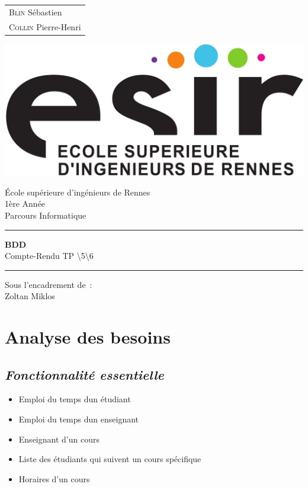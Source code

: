 \documentclass{article}
\begin{document}
\begin{titlepage}
	\vspace{-20px}
	\begin{tabular}{l}
		\textsc{Blin} S\'ebastien\\
		\textsc{Collin} Pierre-Henri
	\end{tabular}
	\hfill \vspace{10px}\includegraphics[scale=0.1]{esir.png}\\
	\vfill
	\begin{center}
		\Huge{\'Ecole sup\'erieure d'ing\'enieurs de Rennes}\\
		\vspace{1cm}
		\LARGE{1\`ere Ann\'ee}\\
		\large{Parcours Informatique}\\
		\vspace{0.5cm}\hrule\vspace{0.5cm}
		\LARGE{\textbf{BDD}}\\
		\Large{Compte-Rendu TP \textbackslash5\textbackslash6}
		\vspace{0.5cm}\hrule
		\vfill
		\vfill
	\end{center}
	\begin{flushleft}
		\Large{Sous l'encadrement de~:}\\
		\vspace{0.2cm}
		\large{{Zoltan} Miklos}
	\end{flushleft}
	\vfill
\end{titlepage}
\section{Analyse des besoins}
\subsection{\textit{Fonctionnalit\'e essentielle}}
\begin{itemize}
\item Emploi du temps d\textquotesingle un \'etudiant
\item Emploi du temps d\textquotesingle un enseignant
\item Enseignant d'un cours
\item Liste des \'etudiants qui suivent un cours sp\'ecifique
\item Horaires d'un cours
\end{itemize}
\end{document}
